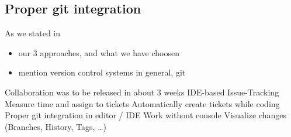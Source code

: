 \subsection{Proper git integration}
As we stated in~ 

\begin{itemize}
	\item our 3 approaches, and what we have choosen
	\item mention version control systems in general, git
\end{itemize}


Collaboration was to be released in about 3 weeks
IDE-based Issue-Tracking
	Measure time and assign to tickets
	Automatically create tickets while coding
Proper git integration in editor / IDE
	Work without console
	Visualize changes
	(Branches, History, Tags, …)

